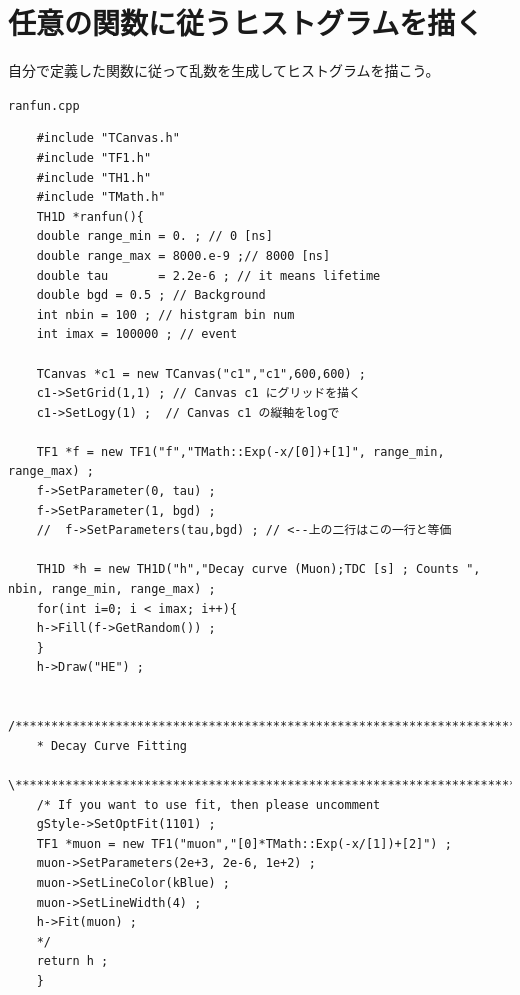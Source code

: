   \clearpage
 \section{任意の関数に従うヒストグラムを描く}
 自分で定義した関数に従って乱数を生成してヒストグラムを描こう。
 \begin{itembox}{\texttt{ranfun.cpp}}
\begin{verbatim}
	#include "TCanvas.h"
	#include "TF1.h"
	#include "TH1.h"
	#include "TMath.h"
	TH1D *ranfun(){
	double range_min = 0. ; // 0 [ns]
	double range_max = 8000.e-9 ;// 8000 [ns]
	double tau       = 2.2e-6 ; // it means lifetime
	double bgd = 0.5 ; // Background
	int nbin = 100 ; // histgram bin num
	int imax = 100000 ; // event

	TCanvas *c1 = new TCanvas("c1","c1",600,600) ;
	c1->SetGrid(1,1) ; // Canvas c1 にグリッドを描く
	c1->SetLogy(1) ;  // Canvas c1 の縦軸をlogで

	TF1 *f = new TF1("f","TMath::Exp(-x/[0])+[1]", range_min, range_max) ;
	f->SetParameter(0, tau) ;
	f->SetParameter(1, bgd) ;
	//  f->SetParameters(tau,bgd) ; // <--上の二行はこの一行と等価

	TH1D *h = new TH1D("h","Decay curve (Muon);TDC [s] ; Counts ", nbin, range_min, range_max) ;
	for(int i=0; i < imax; i++){
	h->Fill(f->GetRandom()) ;
	}
	h->Draw("HE") ;

	/********************************************************************************\
	* Decay Curve Fitting
	\********************************************************************************/
	/* If you want to use fit, then please uncomment
	gStyle->SetOptFit(1101) ;
	TF1 *muon = new TF1("muon","[0]*TMath::Exp(-x/[1])+[2]") ;
	muon->SetParameters(2e+3, 2e-6, 1e+2) ;
	muon->SetLineColor(kBlue) ;
	muon->SetLineWidth(4) ;
	h->Fit(muon) ;
	*/
	return h ;
	}
\end{verbatim}
 \end{itembox}

